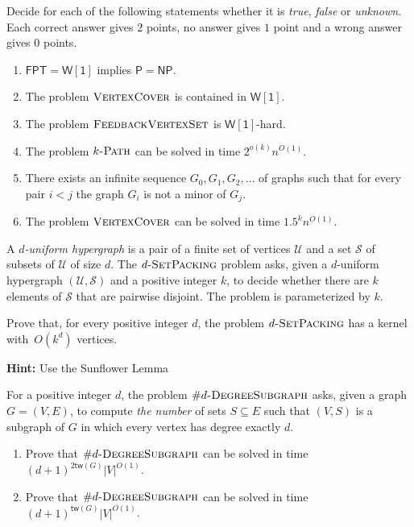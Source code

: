 \begin{exercise}[12 Points]
Decide for each of the following statements whether it is \emph{true}, \emph{false} or \emph{unknown}. Each correct answer gives $2$ points, no answer gives $1$ point and a wrong answer gives $0$ points.
\begin{enumerate}
\item $ \mathsf{FPT} = \mathsf{W[1]}$ implies $\mathsf{P} = \mathsf{NP}$.
\item The problem $\textsc{VertexCover}$ is contained in $\mathsf{W[1]}$.
\item The problem $\textsc{FeedbackVertexSet}$ is $\mathsf{W[1]}$-hard.
\item The problem $k\textsc{-Path}$ can be solved in time $2^{o(k)}n^{O(1)}$.
\item There exists an infinite sequence $G_0,G_1,G_2,\dots$ of graphs such that for every pair $i < j$ the graph $G_i$ is not a minor of $G_j$.
\item The problem $\textsc{VertexCover}$ can be solved in time $1.5^k n^{O(1)}$.
\end{enumerate} 
\end{exercise}

\begin{exercise}[12 Points]
A $d$\emph{-uniform hypergraph} is a pair of a finite set of vertices $\mathcal{U}$ and a set $\mathcal{S}$ of subsets of $\mathcal{U}$ of size $d$. The $d\textsc{-SetPacking}$ problem asks, given a $d$-uniform hypergraph $(\mathcal{U},\mathcal{S})$ and a positive integer $k$, to decide whether there are $k$ elements of $\mathcal{S}$ that are pairwise disjoint. The problem is parameterized by $k$.

Prove that, for every positive integer $d$, the problem $d\textsc{-SetPacking}$ has a kernel with~$O(k^d)$ vertices.

\noindent \textbf{Hint:} Use the Sunflower Lemma
\end{exercise}

\begin{exercise}[6+6 Points]
For a positive integer $d$, the problem $\#d\textsc{-DegreeSubgraph}$ asks, given a graph $G=(V,E)$, to compute \emph{the number} of sets $S \subseteq E$ such that $(V,S)$ is a subgraph of $G$ in which every vertex has degree exactly $d$.
\begin{enumerate}
\item Prove that $\#d\textsc{-DegreeSubgraph}$ can be solved in time $(d+1)^{2 \mathsf{tw}(G)} |V|^{O(1)}$.
\item Prove that $\#d\textsc{-DegreeSubgraph}$ can be solved in time $(d+1)^{ \mathsf{tw}(G)} |V|^{O(1)}$.
\end{enumerate}
\end{exercise}

